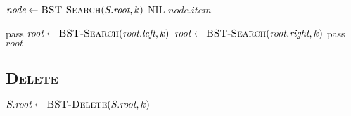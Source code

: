 \begin{minipage}[t]{0.425\linewidth} \begin{algorithm}[H] \begin{algorithmic}[1]
        \State $\textit{node} \gets \textsc{BST-Search}(S.\textit{root}, k)$
            \State \Return $\text{NIL}$
        \EndIf
        \State \Return $\textit{node.item}$
    \EndProcedure
\end{algorithmic} \end{algorithm} \end{minipage}
\hfill
\begin{minipage}[t]{0.525\linewidth} \begin{algorithm}[H] \begin{algorithmic}[1]
        \State {}
            \State pass 
            \State $\textit{root} \gets \textsc{BST-Search}(\textit{root.left}, k)$
            \State $\textit{root} \gets \textsc{BST-Search}(\textit{root.right}, k)$
        \Else {~} 
            \State pass
        \EndIf
        \State \Return $\textit{root}$
    \EndProcedure
\end{algorithmic} \end{algorithm} \end{minipage}

\subsection{\textsc{Delete}}

\begin{algorithm}[H] \begin{algorithmic}[1]
        \State $S.\textit{root} \gets \textsc{BST-Delete}(S.\textit{root}, k)$
    \EndProcedure
\end{algorithmic} \end{algorithm}

